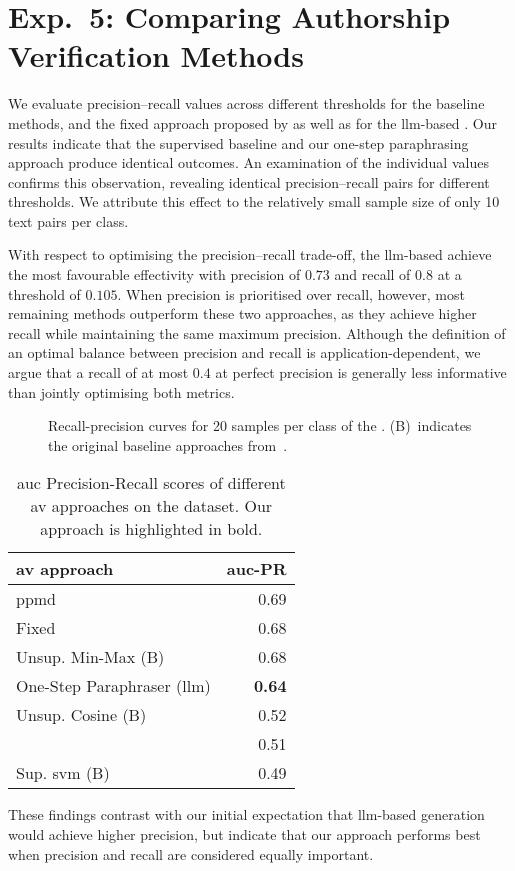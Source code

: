 \section{Exp.\ 5: Comparing Authorship Verification Methods}%
\label{subsec:imp_gen_res}

We evaluate precision–recall values across different thresholds for the baseline methods, and the fixed approach proposed by \citet{koppel_determining_2014} as well as for the \ac{llm}-based \impAppr{}.
Our results indicate that the supervised baseline and our one-step paraphrasing approach produce identical outcomes.
An examination of the individual values confirms this observation, revealing identical precision–recall pairs for different thresholds.
We attribute this effect to the relatively small sample size of only 10 text pairs per class.

With respect to optimising the precision–recall trade-off, the \ac{llm}-based \impAppr{} achieve the most favourable effectivity with precision of $0.73$ and recall of $0.8$ at a threshold of $0.105$.
When precision is prioritised over recall, however, most remaining methods outperform these two approaches, as they achieve higher recall while maintaining the same maximum precision.
Although the definition of an optimal balance between precision and recall is application-dependent, we argue that a recall of at most $0.4$ at perfect precision is generally less informative than jointly optimising both metrics.

\begin{figure}[htbp]
    \centering
    
    \caption[Recall-precision curves for the \dataStudent{}]{Recall-precision curves for 20 samples per class of the \dataStudent{}. 
    (B)~indicates the original baseline approaches from~\citep{koppel_determining_2014}.
    }
    \label{fig:comp_naive_student}
\end{figure}

\begin{table}[h]
\centering
\label{tab:auc_pr}
\caption[\ac{auc} Precision-Recall results]{\ac{auc} Precision-Recall scores of different \ac{av} approaches on the \dataStudent{} dataset. 
Our approach is highlighted in bold.
}
\begin{tabular}{lr}
\toprule
\ac{av} approach           & \ac{auc}-PR \\
\midrule
\acs{ppmd}                       & 0.69   \\
Fixed                      & 0.68   \\
Unsup. Min-Max (B)         & 0.68   \\
One-Step Paraphraser (\ac{llm}) & \textbf{0.64}   \\
Unsup. Cosine (B)          & 0.52   \\
\unmasking{}                  & 0.51   \\
Sup. \ac{svm} (B)               & 0.49  \\
\bottomrule
\end{tabular}%
\end{table}

These findings contrast with our initial expectation that \ac{llm}-based \imp{} generation would achieve higher precision, but indicate that our approach performs best when precision and recall are considered equally important.
